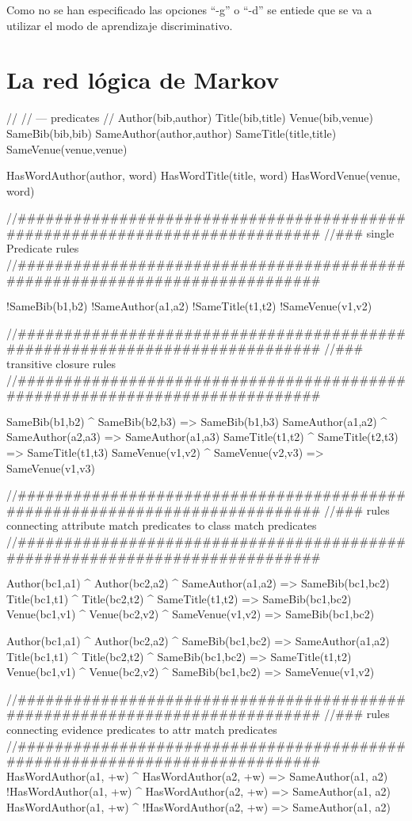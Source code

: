 Como no se han especificado las opciones ``-g'' o ``-d'' se entiede que se va a utilizar el modo de aprendizaje discriminativo.

\section{La red lógica de Markov}

// 
// --- predicates 
// 
Author(bib,author)
Title(bib,title)
Venue(bib,venue)
SameBib(bib,bib)
SameAuthor(author,author)
SameTitle(title,title)
SameVenue(venue,venue)

HasWordAuthor(author, word)
HasWordTitle(title, word)
HasWordVenue(venue, word)

//############################################################################ 
//### single Predicate rules  
//############################################################################ 
 
!SameBib(b1,b2)
!SameAuthor(a1,a2)
!SameTitle(t1,t2)
!SameVenue(v1,v2)

//############################################################################ 
//### transitive closure rules  
//############################################################################ 
 
SameBib(b1,b2) ^ SameBib(b2,b3) => SameBib(b1,b3)
SameAuthor(a1,a2) ^ SameAuthor(a2,a3) => SameAuthor(a1,a3)
SameTitle(t1,t2) ^ SameTitle(t2,t3) => SameTitle(t1,t3)
SameVenue(v1,v2) ^ SameVenue(v2,v3) => SameVenue(v1,v3)

//############################################################################ 
//### rules connecting attribute match predicates to class match predicates   
//############################################################################ 
 
Author(bc1,a1) ^ Author(bc2,a2) ^ SameAuthor(a1,a2) => SameBib(bc1,bc2) 
Title(bc1,t1) ^ Title(bc2,t2) ^ SameTitle(t1,t2) => SameBib(bc1,bc2) 
Venue(bc1,v1) ^ Venue(bc2,v2) ^ SameVenue(v1,v2) => SameBib(bc1,bc2) 

Author(bc1,a1) ^ Author(bc2,a2) ^ SameBib(bc1,bc2) => SameAuthor(a1,a2) 
Title(bc1,t1) ^ Title(bc2,t2) ^ SameBib(bc1,bc2) => SameTitle(t1,t2) 
Venue(bc1,v1) ^ Venue(bc2,v2) ^ SameBib(bc1,bc2) => SameVenue(v1,v2) 


//############################################################################ 
//### rules connecting evidence predicates to attr match predicates 
//############################################################################ 
HasWordAuthor(a1, +w) ^ HasWordAuthor(a2, +w) => SameAuthor(a1, a2)
!HasWordAuthor(a1, +w) ^ HasWordAuthor(a2, +w) => SameAuthor(a1, a2)
HasWordAuthor(a1, +w) ^ !HasWordAuthor(a2, +w) => SameAuthor(a1, a2)


